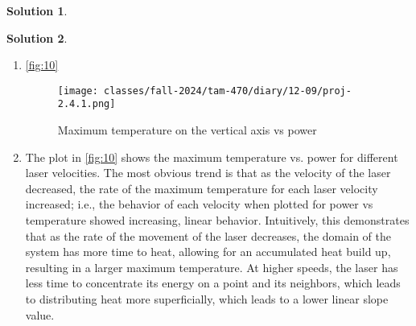 \documentclass[12pt]{article}
\theoremstyle{definition} %
\newtheorem{solution}{Solution}
\theoremstyle{plain} %
\begin{document}
\begin{solution}
\begin{enumerate}
        \end{enumerate}

\end{solution}

\begin{solution}
    
    \begin{enumerate}
        \item \autoref{fig:10} \begin{figure}[htbp]
            \centering
            \texttt{[image: classes/fall-2024/tam-470/diary/12-09/proj-2.4.1.png]}
            \caption{Maximum temperature on the vertical axis vs power}
            \label{fig:10}
        \end{figure}
    \item The plot in \autoref{fig:10} shows the maximum temperature vs. power for different laser velocities. The most obvious trend is that as the velocity of the laser decreased, the rate of the maximum temperature for each laser velocity increased; i.e., the behavior of each velocity when plotted for power vs temperature showed increasing, linear behavior. Intuitively, this demonstrates that as the rate of the movement of the laser decreases, the domain of the system has more time to heat, allowing for an accumulated heat build up, resulting in a larger maximum temperature. 
    At higher speeds, the laser has less time to concentrate its energy on a point and its neighbors, which leads to distributing heat more superficially, which leads to a lower linear slope value. 
    \end{enumerate}
\end{solution}
\end{document}
